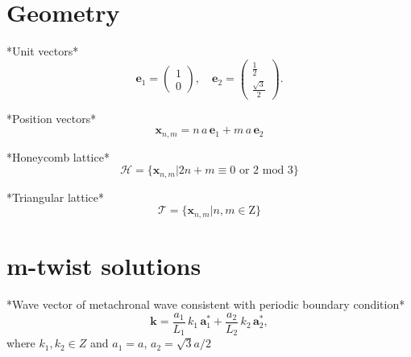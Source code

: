 \documentclass[a4paper,12pt]{article}
\begin{document}


\section*{Geometry}

*Unit vectors*
$$
\mathbf{e}_1 =\left( \begin{array}{c} 1 \\ 0 \end{array} \right), \quad
\mathbf{e}_2 =\left( \begin{array}{c} \frac{1}{2} \\  \frac{\sqrt{3}}{2} \end{array} \right).
$$

*Position vectors*
$$
\mathbf{x}_{n,m} = n\,a\,\mathbf{e}_1 +  m\,a\,\mathbf{e}_2
$$

*Honeycomb lattice*
$$
\mathcal{H} = \{ \mathbf{x}_{n,m} | 2n+m \equiv 0 \text{ or } 2 \text{ mod } 3\}
$$

*Triangular lattice*
$$
\mathcal{T} = \{ \mathbf{x}_{n,m} | n,m \in \mathrm{Z} \}
$$

\section*{m-twist solutions}

*Wave vector of metachronal wave consistent with periodic boundary condition*
$$ \mathbf{k} = \frac{a_1}{L_1}\,k_1\,\mathbf{a}_1^* + \frac{a_2}{L_2}\,k_2\,\mathbf{a}_2^*, $$
where $k_1,k_2\in{Z}$ and $a_1=a$, $a_2 = \sqrt{3} a/2$
\end{document}
